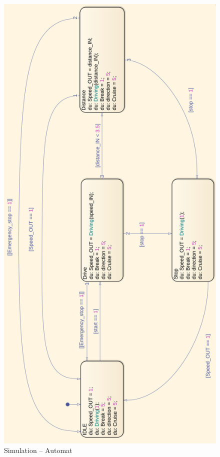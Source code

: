 \pagebreak[1]
\begin{figure}[!ht]
	\begin{center}
		\includegraphics[height=0.86\textheight]{img/5_simulation/Automat_1.png}
		\caption{Simulation – Automat}
		\label{Automat:img:Automat}
	\end{center}
\end{figure}
\pagebreak[4]




